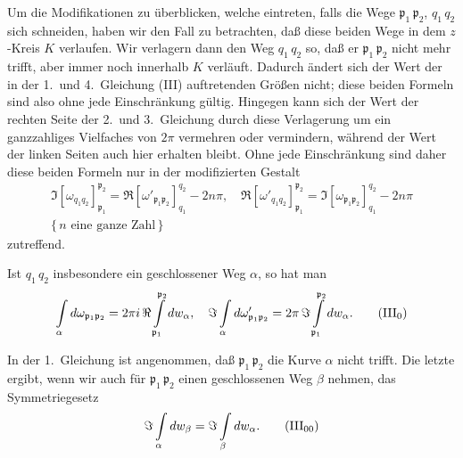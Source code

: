 \documentclass{article}
\begin{document}
Um die Modifikationen zu überblicken, welche eintreten, falls die Wege $\mathfrak{p}_1\,\mathfrak{p}_2$, $q_1\,q_2$ sich schneiden, haben wir den Fall zu betrachten, daß diese beiden Wege in dem $z$-Kreis $K$ verlaufen. Wir verlagern dann den Weg $q_1\,q_2$ so, daß er $\mathfrak{p}_1\,\mathfrak{p}_2$ nicht mehr trifft, aber immer noch innerhalb $K$ verläuft. Dadurch ändert sich der Wert der in der 1.\ und 4.\ Gleichung (III) auftretenden Größen nicht; diese beiden Formeln sind also ohne jede Einschränkung gültig. Hingegen kann sich der Wert der rechten Seite der 2.\ und 3.\ Gleichung durch diese Verlagerung um ein ganzzahliges Vielfaches von $2\pi$ vermehren oder vermindern, während der Wert der linken Seiten auch hier erhalten bleibt. Ohne jede Einschränkung sind daher diese beiden Formeln nur in der modifizierten Gestalt
\[ \begin{gathered}
\Im [\omega_{q_1 q_2}]_{\mathfrak{p}_1}^{\mathfrak{p}_2} = \Re [\omega'_{\mathfrak{p}_1 \mathfrak{p}_2}]_{q_1}^{q_2} - 2n\pi, \quad \Re [\omega'_{q_1 q_2}]_{\mathfrak{p}_1}^{\mathfrak{p}_2} = \Im [\omega_{\mathfrak{p}_1 \mathfrak{p}_2}]_{q_1}^{q_2} - 2n\pi \\
\{\, n \text{ eine ganze Zahl} \,\}
\end{gathered} \]
zutreffend.

Ist $q_1\,q_2$ insbesondere ein geschlossener Weg $\alpha$, so hat man
\[ \int\limits_\alpha d\omega_{\mathfrak{p}_1 \mathfrak{p}_2} = 2\pi i\,\Re \int\limits_{\mathfrak{p}_1}^{\mathfrak{p}_2} dw_\alpha, \quad \Im \int\limits_\alpha d\omega'_{\mathfrak{p}_1 \mathfrak{p}_2} = 2\pi\,\Im \int\limits_{\mathfrak{p}_1}^{\mathfrak{p}_2} dw_\alpha. \tag{$\mathrm{III}_0$} \]

In der 1.\ Gleichung ist angenommen, daß $\mathfrak{p}_1\,\mathfrak{p}_2$ die Kurve $\alpha$ nicht trifft. Die letzte ergibt, wenn wir auch für $\mathfrak{p}_1\,\mathfrak{p}_2$ einen geschlossenen Weg $\beta$ nehmen, das Symmetriegesetz
\[ \Im \int\limits_\alpha dw_\beta = \Im \int\limits_\beta dw_\alpha. \tag{$\mathrm{III}_{00}$} \]
\end{document}
